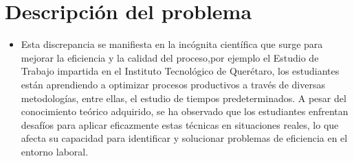    \section{Descripción del problema}
    \begin{itemize}
    \item Esta discrepancia se manifiesta en la incógnita científica que surge para mejorar la eficiencia y la calidad del proceso,por ejemplo el Estudio de Trabajo impartida en el Instituto Tecnológico de Querétaro, los estudiantes están aprendiendo a optimizar procesos productivos a través de diversas metodologías, entre ellas, el estudio de tiempos predeterminados. A pesar del conocimiento teórico adquirido, se ha observado que los estudiantes enfrentan desafíos para aplicar eficazmente estas técnicas en situaciones reales, lo que afecta su capacidad para identificar y solucionar problemas de eficiencia en el entorno laboral. \cite{Niebel}
    

\end{itemize}
